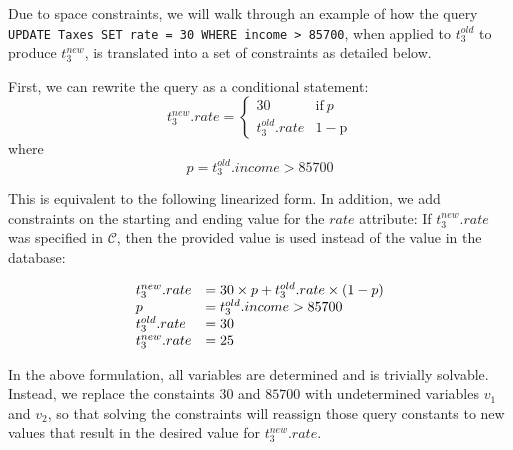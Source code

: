 
Due to space constraints, we will walk through an example of how the query
\texttt{UPDATE Taxes SET rate = 30 WHERE income > 85700}, when applied to 
$t_3^{old}$ to produce $t_3^{new}$, is translated into a set of constraints
as detailed below.

First, we can rewrite the query as a conditional statement:
\[
t_3^{new}.rate = \begin{cases}
				  30              & \mathrm{if}\ p  \\
                  t_3^{old}.rate  & \mathrm{1-p}
               \end{cases}
\]
where \[p = t_3^{old}.income > 85700\]

This is equivalent to the following linearized form.
In addition, we add constraints on the starting and ending value for the $rate$ attribute:
If $t_3^{new}.rate$ was specified in $\mathcal{C}$, then the provided value
is used instead of the value in the database:

\[
\begin{array}{l l l}
t_3^{new}.rate &= 30\times p + t_3^{old}.rate\times (1-p)\\
p              &= t_3^{old}.income > 85700\\
t_3^{old}.rate &= 30 \\
t_3^{new}.rate &= 25
\end{array}
\]

In the above formulation, all variables are determined and is trivially
solvable.  Instead, we replace
the constaints $30$ and $85700$ with undetermined variables $v_1$ and $v_2$,
so that solving the constraints will reassign those query constants 
to new values that result in the desired value for $t_3^{new}.rate$.  
\iffalse
\[
\begin{array}{l l l}
t_3^{new}.rate &= v_1\times p + t_3^{old}.rate\times (1-p)\\
p              &= t_3^{old}.income > v_2\\
t_3^{old}.rate &= 30 \\
t_3^{new}.rate &= 25 \\
v_1            &\in [minval, maxval]\\
v_2            &\in [minval, maxval]\\
\end{array}
\]
\fi